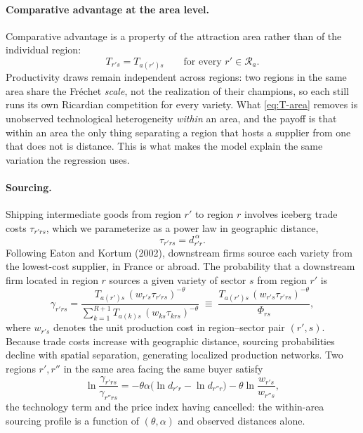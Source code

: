 \paragraph{Comparative advantage at the area level.} Comparative advantage is a property of the
attraction area rather than of the individual region:
\begin{equation}
T_{r's}=T_{a(r')s}\qquad\text{for every }r'\in\mathcal{R}_{a}.
\label{eq:T-area}
\end{equation}
Productivity draws remain independent across regions: two regions in the same area share the
Fr\'echet \emph{scale}, not the realization of their champions, so each still runs its own
Ricardian competition for every variety. What \eqref{eq:T-area} removes is unobserved
technological heterogeneity \emph{within} an area, and the payoff is that within an area the
only thing separating a region that hosts a supplier from one that does not is distance. This
is what makes the model explain the same variation the regression uses.

\paragraph{Sourcing.} Shipping intermediate goods from region $r'$ to region $r$ involves
iceberg trade costs $\tau_{r'rs}$, which we parameterize as a power law in geographic distance,
\begin{equation}
\tau_{r'rs}=d_{r'r}^{\,\alpha}.
\label{eq:tau}
\end{equation}
Following Eaton and Kortum (2002), downstream firms source each variety from the lowest-cost
supplier, in France or abroad. The probability that a downstream firm located in region $r$
sources a given variety of sector $s$ from region $r'$ is
\begin{equation}
\gamma_{r'rs}=\frac{T_{a(r')s}\,(w_{r's}\tau_{r'rs})^{-\theta}}
{\sum_{k=1}^{R+1}T_{a(k)s}\,(w_{ks}\tau_{krs})^{-\theta}}
\;\equiv\;\frac{T_{a(r')s}\,(w_{r's}\tau_{r'rs})^{-\theta}}{\Phi_{rs}},
\label{eq:ek-share}
\end{equation}
where $w_{r's}$ denotes the unit production cost in region--sector pair $(r',s)$. Because trade
costs increase with geographic distance, sourcing probabilities decline with spatial
separation, generating localized production networks. Two regions $r',r''$ in the same area
facing the same buyer satisfy
\begin{equation}
\ln\frac{\gamma_{r'rs}}{\gamma_{r''rs}}
=-\theta\alpha\big(\ln d_{r'r}-\ln d_{r''r}\big)-\theta\ln\frac{w_{r's}}{w_{r''s}},
\label{eq:within-area}
\end{equation}
the technology term and the price index having cancelled: the within-area sourcing profile is a
function of $(\theta,\alpha)$ and observed distances alone.

